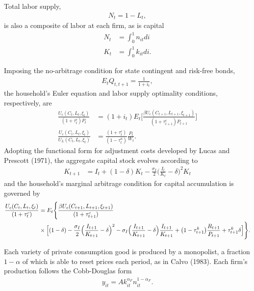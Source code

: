\documentclass[12pt,letterpaper]{article}
\begin{document}
\noindent Total labor supply, 
\begin{align}
N_t = 1 - L_t,
\end{align}
is also a composite of labor at each firm, as is capital
\begin{align}
N_t &= \int_0^1 n_{it} di \\
K_t &= \int_0^1 k_{it} di.
\end{align}

\noindent Imposing the no-arbitrage condition for state contingent and risk-free bonds,
\begin{align}
E_t Q_{t,t+1} = \frac{1}{1+i_t},
\end{align}
\noindent the household's Euler equation and labor supply optimality conditions, respectively, are 
\begin{align}
\frac{U_c (C_t, L_t, \xi_t )}{(1+\tau_t^c)P_t} &= (1+i_t) E_t \Big[ \frac{\beta U_c (C_{t+1}, L_{t+1}, \xi_{t+1})} {(1+\tau_{t+1}^c)P_{t+1}} \Big] \\
\frac{U_c (C_t, L_t,\xi_t )}{U_L (C_t, L_t, \xi_t )} &= \frac{(1+\tau_t^c)}{(1 - \tau_t^n)} \frac{P_t}{W_t}. 
\end{align}
\noindent Adopting the functional form for adjustment costs developed by Lucas and Prescott (1971), the aggregate capital stock evolves according to 
\begin{align}
K_{t+1} &= I_t + (1-\delta)K_t - \frac{\sigma_I}{2} \Big(\frac{I_t}{K_t} - \delta \Big)^2 K_t
\end{align}
\noindent and the household's marginal arbitrage condition for capital accumulation is governed by
\begin{align}
\frac{U_c (C_t, L_t,\xi_t )}{(1+\tau_t^c)} &= E_t \Bigg\{ \frac{\beta U_c (C_{t+1}, L_{t+1}, \xi_{t+1})} {(1+\tau_{t+1}^c)}   \\ \notag & \times \Big[ (1 - \delta) - \frac{\sigma_I}{2} \Big( \frac{I_{t+1}}{K_{t+1}} - \delta \Big)^2  - \sigma_I \Big( \frac{I_{t+1}}{K_{t+1}} - \delta \Big) \frac{I_{t+1}}{K_{t+1}} + \big(1 - \tau_{t+1}^k\big) \frac{R_{t+1}}{P_{t+1}} + \tau_{t+1}^k \delta \Big] \Bigg\}. 
\end{align}

\noindent Each variety of private consumption good is produced by a monopolist, a fraction $ 1 - \alpha$ of which is able to reset prices each period, as in Calvo (1983). Each firm's production follows the Cobb-Douglas form
\begin{align}
y_{it} = A k^{\alpha_F}_{it} n^{1-\alpha_F}_{it}.
\end{align}
\end{document}
